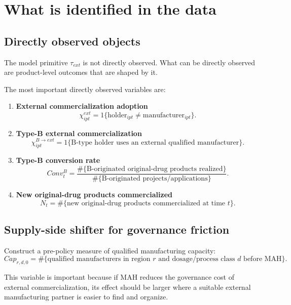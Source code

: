 \documentclass[12pt]{article}
\begin{document}
\section{What is identified in the data}

\subsection{Directly observed objects}

The model primitive \(\tau_{ext}\) is not directly observed.
What can be directly observed are product-level outcomes that are shaped by it.

The most important directly observed variables are:

\begin{enumerate}[leftmargin=2em]
    \item \textbf{External commercialization adoption}
    \[
    \chi^{ext}_{ipt}=1\{\text{holder}_{ipt}\neq \text{manufacturer}_{ipt}\}.
    \]

    \item \textbf{Type-B external commercialization}
    \[
    \chi^{B\to ext}_{ipt}=1\{\text{B-type holder uses an external qualified manufacturer}\}.
    \]

    \item \textbf{Type-B conversion rate}
    \[
    Conv^B_t
    =
    \frac{\#\{\text{B-originated original-drug products realized}\}}
         {\#\{\text{B-originated projects/applications}\}}.
    \]

    \item \textbf{New original-drug products commercialized}
    \[
    N_t = \#\{\text{new original-drug products commercialized at time } t\}.
    \]
\end{enumerate}

\subsection{Supply-side shifter for governance friction}

Construct a pre-policy measure of qualified manufacturing capacity:
\[
Cap_{r,d,0}
=
\#\{\text{qualified manufacturers in region } r \text{ and dosage/process class } d \text{ before MAH}\}.
\]

This variable is important because if MAH reduces the governance cost of external commercialization,
its effect should be larger where a suitable external manufacturing partner is easier to find and organize.
\end{document}

